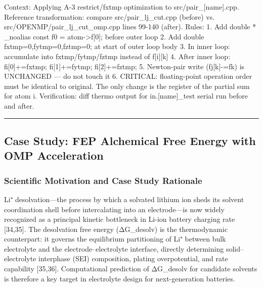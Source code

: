 \documentclass[
  11pt,
]{article}
\newenvironment{Shaded}{}{}
\newcommand{\NormalTok}[1]{#1}
\begin{document}
\begin{Shaded}
\begin{Highlighting}[]
\NormalTok{Context: Applying A{-}3 restrict/fxtmp optimization to src/pair\_[name].cpp.}
\NormalTok{Reference transformation: compare src/pair\_lj\_cut.cpp (before) vs.}
\NormalTok{                          src/OPENMP/pair\_lj\_cut\_omp.cpp lines 99{-}140 (after).}
\NormalTok{Rules:}
\NormalTok{  1. Add  double * \_noalias const f0 = atom{-}\textgreater{}f[0];  before outer loop}
\NormalTok{  2. Add  double fxtmp=0,fytmp=0,fztmp=0;  at start of outer loop body}
\NormalTok{  3. In inner loop: accumulate into fxtmp/fytmp/fztmp instead of f[i][k]}
\NormalTok{  4. After inner loop: fi[0]+=fxtmp; fi[1]+=fytmp; fi[2]+=fztmp;}
\NormalTok{  5. Newton{-}pair write (fj[k]{-}=fk) is UNCHANGED — do not touch it}
\NormalTok{  6. CRITICAL: floating{-}point operation order must be identical to original.}
\NormalTok{              The only change is the register of the partial sum for atom i.}
\NormalTok{Verification: diff thermo output for in.[name]\_test serial run before and after.}
\end{Highlighting}
\end{Shaded}

\begin{center}\rule{0.5\linewidth}{0.5pt}\end{center}

\subsection{Case Study: FEP Alchemical Free Energy with OMP
Acceleration}\label{case-study-fep-alchemical-free-energy-with-omp-acceleration}

\subsubsection{Scientific Motivation and Case Study
Rationale}\label{scientific-motivation-and-case-study-rationale}

Li⁺ desolvation---the process by which a solvated lithium ion sheds its
solvent coordination shell before intercalating into an electrode---is
now widely recognized as a principal kinetic bottleneck in Li-ion
battery charging rate {[}34,35{]}. The desolvation free energy
(ΔG\_desolv) is the thermodynamic counterpart: it governs the
equilibrium partitioning of Li⁺ between bulk electrolyte and the
electrode--electrolyte interface, directly determining
solid--electrolyte interphase (SEI) composition, plating overpotential,
and rate capability {[}35,36{]}. Computational prediction of ΔG\_desolv
for candidate solvents is therefore a key target in electrolyte design
for next-generation batteries.
\end{document}

